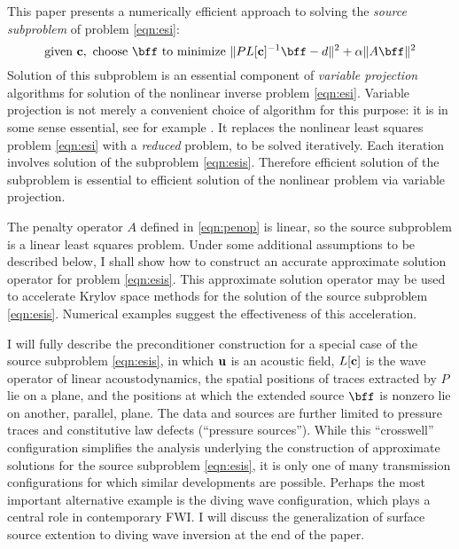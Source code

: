 This paper presents a numerically efficient approach to solving the
{\em source subproblem} of problem \ref{eqn:esi}:
\begin{equation}
\label{eqn:esis}
\mbox{given } {\bf c}, \mbox{ choose } \bff \mbox{ to minimize }
\|PL[{\bf c}]^{-1}\bff -d \|^2 + \alpha \|A\bff\|^2 
\end{equation}
Solution of this subproblem is an essential component of {\em variable
  projection} algorithms for solution of the nonlinear inverse problem
\ref{eqn:esi}. Variable projection is not merely a convenient choice
of algorithm for this purpose: it is in some sense essential, see for
example \cite{Symes:SEG20}. It replaces the nonlinear
least squares problem \ref{eqn:esi} with a {\em reduced} problem, to
be solved iteratively. Each iteration involves solution of the
subproblem \ref{eqn:esis}. Therefore efficient solution of the
subproblem is essential to efficient solution of the nonlinear problem
via variable projection.

The penalty operator $A$ defined in \ref{eqn:penop} is linear, so the source
subproblem is a linear least squares problem. Under some additional
assumptions to be described below, I shall show how to construct an
accurate approximate solution operator for problem
\ref{eqn:esis}. This approximate solution operator may be used to
accelerate Krylov space methods for the solution of the source
subproblem \ref{eqn:esis}. Numerical examples suggest the
effectiveness of this acceleration.

I will fully describe the preconditioner construction for a special
case of the source subproblem \ref{eqn:esis}, in which ${\bf u}$ is an
acoustic field, $L[{\bf c}]$ is the wave operator of linear
acoustodynamics, the spatial positions of traces extracted by $P$ lie
on a plane, and the positions at which the extended
source $\bff$ is nonzero lie on another, parallel, plane. The data and
sources are further limited to pressure traces and constitutive law
defects (``pressure sources''). While this
``crosswell'' configuration simplifies the analysis underlying the
construction of approximate solutions for the source subproblem
\ref{eqn:esis}, it is only one of many transmission configurations for
which similar developments are possible. Perhaps the most important
alternative example is the diving wave configuration, which plays a
central role in contemporary FWI. I will discuss the generalization of
surface source extention to diving wave inversion at the end of the
paper.

